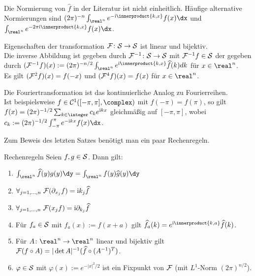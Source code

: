 \begin{Bem}
    Die Normierung von $\widehat{f}$ in der Literatur ist nicht einheitlich.
    Häufige alternative Normierungen sind
    $(2\pi)^{-n} \int_{\real^n} e^{-\iu\innerproduct{k,x}} f(x)\dx$ und
    $\int_{\real^n} e^{-2\pi\iu\innerproduct{k,x}} f(x)\dx$.
\end{Bem}

\begin{Satz}{Eigenschaften der transformation}
    $\F\colon \S \rightarrow \S$ ist linear und bijektiv.\\
    Die inverse Abbildung ist gegeben durch $\F^{-1}\colon \S \rightarrow \S$ mit
    $\F^{-1} f \in \S$ der  gegeben durch
    $(\F^{-1} f)(x) := (2\pi)^{-n/2} \int_{\real^n} e^{\iu\innerproduct{k,x}} \widehat{f}(k)dk$
    für $x \in \real^n$.\\
    Es gilt $(\F^2 f)(x) = f(-x)$ und $(\F^4 f)(x) = f(x)$ für $x \in \real^n$.
\end{Satz}

\begin{Bem}
    Die Fouriertransformation ist das kontinuierliche Analog zu Fourierreihen.\\
    Ist beispielsweise $f \in \C^1([-\pi,\pi], \complex)$ mit $f(-\pi) = f(\pi)$,
    so gilt $f(x) = (2\pi)^{-1/2} \sum_{k \in \integer} c_k e^{\iu kx}$ gleichmäßig auf
    $[-\pi, \pi]$, wobei $c_k := (2\pi)^{-1/2} \int_{-\pi}^\pi e^{-\iu kx} f(x)\dx$.
\end{Bem}

\linie

\begin{Bem}
    Zum Beweis des letzten Satzes benötigt man ein paar Rechenregeln.
\end{Bem}

\begin{Satz}{Rechenregeln}
    Seien $f, g \in \S$.
    Dann gilt:
    \begin{enumerate}
        \item
        $\int_{\real^n} \widehat{f}(y)g(y)\dy = \int_{\real^n} f(y)\widehat{g}(y)\dy$

        \item
        $\forall_{j=1,\dotsc,n}\;
        \F(\partial_{x_j} f) = \iu k_j \widehat{f}$

        \item
        $\forall_{j=1,\dotsc,n}\;
        \F(x_j f) = \iu \partial_{k_j} \widehat{f}$

        \item
        Für $f_a \in \S$ mit $f_a(x) := f(x + a)$ gilt
        $\widehat{f_a}(k) = e^{\iu\innerproduct{k,a}} \widehat{f}(k)$.

        \item
        Für $A\colon \real^n \rightarrow \real^n$ linear und bijektiv gilt
        $\F(f \circ A) = |\det A|^{-1} (\widehat{f} \circ (A^{-1})^T)$.

        \item
        $\varphi \in \S$ mit $\varphi(x) := e^{-|x|^2/2}$ ist ein Fixpunkt von $\F$
        (mit $L^1$-Norm $(2\pi)^{n/2}$).
    \end{enumerate}
\end{Satz}

